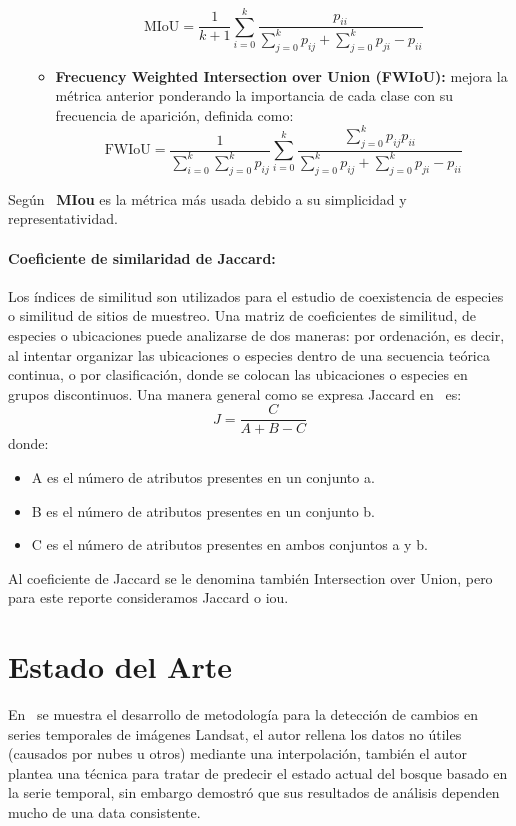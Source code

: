 \begin{itemize}
\begin{itemize}
			\begin{equation}
			\text{MIoU}= \frac{1}{k+1}\sum_{i=0}^k\frac{p_{ii}}{\sum_{j=0}^k p_{ij}+\sum_{j=0}^{k}p_{ji}-p_{ii}}
			\end{equation}
			\item \textbf{Frecuency Weighted Intersection over Union (FWIoU):} mejora la métrica anterior ponderando la importancia de cada clase con su frecuencia de aparición, definida como:
				\begin{equation}
				    				\text{FWIoU}= \frac{1}{\sum_{i=0}^k \sum_{j=0}^kp_{ij}}\sum_{i=0}^k\frac{\sum_{j=0}^kp_{ij}p_{ii}}{\sum_{j=0}^kp_{ij}+\sum_{j=0}^{k}p_{ji}-p_{ii}}
				    				\end{equation}
		  \end{itemize}
\end{itemize}
Según~\cite{GarciaGarcia2017} \textbf{MIou} es la métrica más usada debido a su simplicidad y representatividad.
\paragraph{Coeficiente de similaridad de Jaccard:} Los índices de similitud son utilizados para el estudio de coexistencia de especies o similitud de sitios de muestreo. Una matriz de coeficientes de similitud, de especies o ubicaciones puede analizarse de dos maneras: por ordenación, es decir, al intentar organizar las ubicaciones o especies dentro de una secuencia teórica continua, o por clasificación, donde se colocan las ubicaciones o especies en grupos discontinuos.
Una manera general como se expresa Jaccard en~\cite{Real1996} es:
\begin{equation}
    J = \frac{C}{A+B-C}
\end{equation}
donde:
\begin{itemize}
    \item A es el número de atributos presentes en un conjunto a.
    \item B es el número de atributos presentes en un conjunto b.
    \item C es el número de atributos presentes en ambos conjuntos a y b.
\end{itemize}
Al coeficiente de Jaccard se le denomina también Intersection over Union, pero para este reporte consideramos Jaccard o \gls{iou}.
\section{Estado del Arte}

En~\cite{Gomez2015} se muestra el desarrollo de metodología para la detección de cambios en series temporales de imágenes Landsat, el autor rellena los datos no útiles (causados por nubes u otros) mediante una interpolación, también el autor plantea una técnica para tratar de predecir el estado actual del bosque basado en la serie temporal, sin embargo demostró que sus resultados de análisis dependen mucho de una data consistente.


